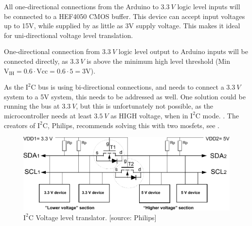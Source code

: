 All one-directional connections from the Arduino to  $\SI{3,3}{V}$ logic level inputs will be connected to a HEF4050 CMOS buffer. This device can accept input voltages up to 15V, while supplied by as little as 3V supply voltage. This makes it ideal for uni-directional voltage level translation. 

One-directional connection from  $\SI{3,3}{V}$ logic level output to Arduino inputs will be connected directly, as $\SI{3,3}{V}$ is above the minimum high level threshold (Min $\text{V}_\text{IH}=\SI{0,6}\cdot \text{Vcc} = \SI{0,6}\cdot 5 = 3$V). \cite{Atmega}

As the $\text{I}^2\text{C}$ bus is using bi-directional connections, and needs to connect a $\SI{3,3}{V}$ system to a 5V system, this needs to be addressed as well. One solution could be running the bus at $\SI{3,3}{V}$, but this is unfortunately not possible, as the microcontroller needs at least $\SI{3,5}{V}$ as HIGH voltage, when in  $\text{I}^2\text{C}$ mode. \cite{Atmega}. The creators of $\text{I}^2\text{C}$, Philips, recommends solving this with two mosfets, see .

\begin{figure}[H]
	\centering
	\includegraphics[scale=0.9]{figures/i2cLevel.pdf}
	\caption{$\text{I}^2\text{C}$ Voltage level translator. [source: Philips]}
	\label{i2clevel}
\end{figure}

